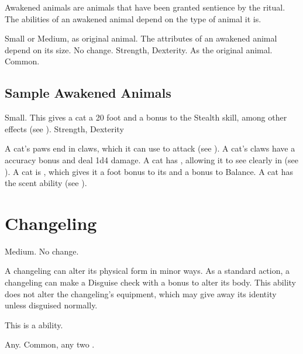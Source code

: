  Awakened animals are animals that have been granted sentience by the  ritual.
  The abilities of an awakened animal depend on the type of animal it is.

   Small or Medium, as original animal.
   The attributes of an awakened animal depend on its size.
   No change.
    Strength,  Dexterity.
   As the original animal.
   Common.

  \subsection{Sample Awakened Animals}


     Small. This gives a cat a 20 foot  and a  bonus to the Stealth skill, among other effects (see ).
      Strength,  Dexterity
    \begin{itemize}
       A cat's paws end in claws, which it can use to attack (see ). A cat's claws have a  accuracy bonus and deal 1d4 damage.
       A cat has , allowing it to see clearly in  (see ).
       A cat is , which gives it a  foot bonus to its  and a  bonus to Balance.
       A cat has the scent ability (see ).
    \end{itemize}

\section{Changeling}

   Medium.
   No change.
  \begin{itemize}
     A changeling can alter its physical form in minor ways. As a standard action, a changeling can make a Disguise check with a  bonus to alter its body. This ability does not alter the changeling's equipment, which may give away its identity unless disguised normally.

      This is a \magical ability.
  \end{itemize}
   Any.
   Common, any two .

